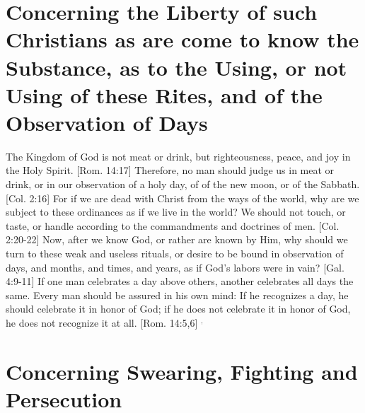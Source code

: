 \documentclass[../main.tex] {subfiles}
\begin{document}
	\section{Concerning the Liberty of such Christians as are come to know the Substance, as to the Using, or not Using of these Rites, and of the Observation of Days}

	The Kingdom of God is not meat or drink, but righteousness, peace, and joy in the Holy Spirit. [Rom. 14:17]  Therefore, no man should judge us in meat or drink, or in our observation of a holy day, of of the new moon, or of the Sabbath. [Col. 2:16]  For if we are dead with Christ from the ways of the world, why are we subject to these ordinances as if we live in the world? We should not touch, or taste, or handle according to the commandments and doctrines of men. [Col. 2:20-22]  Now, after we know God, or rather are known by Him, why should we turn to these weak and useless rituals, or desire to be bound in observation of days, and months, and times, and years, as if God's labors were in vain? [Gal. 4:9-11]  If one man celebrates a day above others, another celebrates all days the same. Every man should be assured in his own mind: If he recognizes a day, he should celebrate it in honor of God; if he does not celebrate it in honor of God, he does not recognize it at all. [Rom. 14:5,6] $^{,}$

	\section{Concerning Swearing, Fighting and Persecution}
\end{document}
